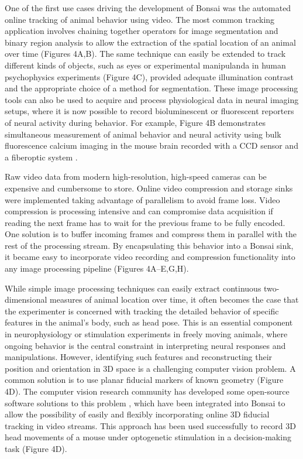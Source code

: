 One of the first use cases driving the development of Bonsai was the automated online tracking of animal behavior using video. The most common tracking application involves chaining together operators for image segmentation and binary region analysis to allow the extraction of the spatial location of an animal over time (Figures 4A,B). The same technique can easily be extended to track different kinds of objects, such as eyes or experimental manipulanda in human psychophysics experiments (Figure 4C), provided adequate illumination contrast and the appropriate choice of a method for segmentation. These image processing tools can also be used to acquire and process physiological data in neural imaging setups, where it is now possible to record bioluminescent or fluorescent reporters of neural activity during behavior. For example, Figure 4B demonstrates simultaneous measurement of animal behavior and neural activity using bulk fluorescence calcium imaging in the mouse brain recorded with a CCD sensor and a fiberoptic system \cite{Tecuapetla2014}.

Raw video data from modern high-resolution, high-speed cameras can be expensive and cumbersome to store. Online video compression and storage sinks were implemented taking advantage of parallelism to avoid frame loss. Video compression is processing intensive and can compromise data acquisition if reading the next frame has to wait for the previous frame to be fully encoded. One solution is to buffer incoming frames and compress them in parallel with the rest of the processing stream. By encapsulating this behavior into a Bonsai sink, it became easy to incorporate video recording and compression functionality into any image processing pipeline (Figures 4A–E,G,H).

While simple image processing techniques can easily extract continuous two-dimensional measures of animal location over time, it often becomes the case that the experimenter is concerned with tracking the detailed behavior of specific features in the animal's body, such as head pose. This is an essential component in neurophysiology or stimulation experiments in freely moving animals, where ongoing behavior is the central constraint in interpreting neural responses and manipulations. However, identifying such features and reconstructing their position and orientation in 3D space is a challenging computer vision problem. A common solution is to use planar fiducial markers of known geometry \cite{Kato1999, Garrido-Jurado2014} (Figure 4D). The computer vision research community has developed some open-source software solutions to this problem \cite{Garrido-Jurado2014}, which have been integrated into Bonsai to allow the possibility of easily and flexibly incorporating online 3D fiducial tracking in video streams. This approach has been used successfully to record 3D head movements of a mouse under optogenetic stimulation in a decision-making task (Figure 4D).

